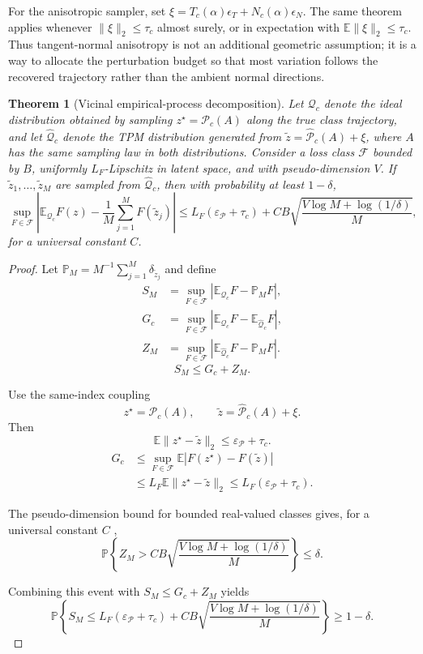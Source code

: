 \documentclass[preprint,12pt,number]{elsarticle}
\newtheorem{theorem}{Theorem}
\begin{document}
For the anisotropic sampler, set $\xi=T_c(\alpha)\epsilon_T+N_c(\alpha)\epsilon_N$. The same theorem applies whenever $\lVert\xi\rVert_2\le\tau_c$ almost surely, or in expectation with $\mathbb{E}\lVert\xi\rVert_2\le\tau_c$. Thus tangent-normal anisotropy is not an additional geometric assumption; it is a way to allocate the perturbation budget so that most variation follows the recovered trajectory rather than the ambient normal directions.

\begin{theorem}[Vicinal empirical-process decomposition]
	Let $\mathcal{Q}_c$ denote the ideal distribution obtained by sampling $z^\star=\mathcal{P}_c(A)$ along the true class trajectory, and let $\widehat{\mathcal{Q}}_c$ denote the TPM distribution generated from $\tilde z=\widehat{\mathcal{P}}_c(A)+\xi$, where $A$ has the same sampling law in both distributions. Consider a loss class $\mathcal{F}$ bounded by $B$, uniformly $L_F$-Lipschitz in latent space, and with pseudo-dimension $V$. If $\tilde z_1,\ldots,\tilde z_M$ are sampled from $\widehat{\mathcal{Q}}_c$, then with probability at least $1-\delta$,
	\[
	\sup_{F\in\mathcal{F}}
	\left|
	\mathbb{E}_{\mathcal{Q}_c}F(z)-
	\frac{1}{M}\sum_{j=1}^{M}F(\tilde z_j)
	\right|
	\le
	L_F(\varepsilon_{\mathcal{P}}+\tau_c)
	+
	CB\sqrt{\frac{V\log M+\log(1/\delta)}{M}},
	\]
	for a universal constant $C$.
\end{theorem}

\begin{proof}
	Let $\mathbb{P}_M=M^{-1}\sum_{j=1}^{M}\delta_{\tilde z_j}$ and define
	\[
	\begin{aligned}
	S_M
	&=
	\sup_{F\in\mathcal{F}}
	\left|
	\mathbb{E}_{\mathcal{Q}_c}F-\mathbb{P}_M F
	\right|,\\
	G_c
	&=
	\sup_{F\in\mathcal{F}}
	\left|
	\mathbb{E}_{\mathcal{Q}_c}F-\mathbb{E}_{\widehat{\mathcal{Q}}_c}F
	\right|,\\
	Z_M
	&=
	\sup_{F\in\mathcal{F}}
	\left|
	\mathbb{E}_{\widehat{\mathcal{Q}}_c}F-\mathbb{P}_M F
	\right|.
	\end{aligned}
	\]
	\[
	S_M\le G_c+Z_M .
	\]

	Use the same-index coupling
	\[
	z^\star=\mathcal{P}_c(A),\qquad
	\tilde z=\widehat{\mathcal{P}}_c(A)+\xi .
	\]
	Then
	\[
	\mathbb{E}\lVert z^\star-\tilde z\rVert_2
	\le
	\varepsilon_{\mathcal{P}}+\tau_c .
	\]
	\[
	\begin{aligned}
	G_c
	&\le
	\sup_{F\in\mathcal{F}}
	\mathbb{E}\left|F(z^\star)-F(\tilde z)\right|\\
	&\le
	L_F\mathbb{E}\lVert z^\star-\tilde z\rVert_2
	\le
	L_F(\varepsilon_{\mathcal{P}}+\tau_c).
	\end{aligned}
	\]

	The pseudo-dimension bound for bounded real-valued classes gives, for a universal constant $C$ \citep{vapnik1998statistical, vandervaart1996weak, wainwright2019high},
	\[
	\mathbb{P}\left\{
	Z_M>
	CB\sqrt{\frac{V\log M+\log(1/\delta)}{M}}
	\right\}
	\le\delta .
	\]

	Combining this event with $S_M\le G_c+Z_M$ yields
	\[
	\mathbb{P}\left\{
	S_M
	\le
	L_F(\varepsilon_{\mathcal{P}}+\tau_c)
	+
	CB\sqrt{\frac{V\log M+\log(1/\delta)}{M}}
	\right\}
	\ge
	1-\delta .
	\]
\end{proof}
\end{document}
